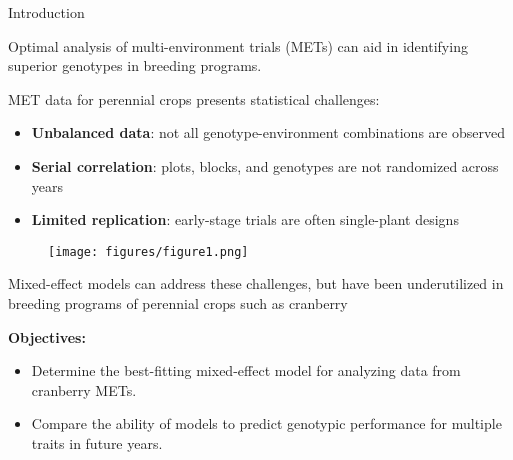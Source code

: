 \documentclass[final]{beamer}
\newlength{\onecolwid}
\begin{document}
\begin{frame}[t]
\begin{columns}[t]
\begin{column}{\onecolwid}
\begin{block}{Introduction}

Optimal analysis of multi-environment trials (METs) can aid in identifying superior genotypes in breeding programs.

\vspace{0.5cm}

MET data for perennial crops presents statistical challenges:
\begin{itemize}
  \item \textbf{Unbalanced data}: not all genotype-environment combinations are observed
  \item \textbf{Serial correlation}: plots, blocks, and genotypes are not randomized across years
  \item \textbf{Limited replication}: early-stage trials are often single-plant designs
\end{itemize}

\vspace{0.5cm}

%
\begin{center}
  \begin{figure}
    \texttt{[image: figures/figure1.png]}
  \end{figure}
\end{center}


\vspace{0.5cm}

Mixed-effect models can address these challenges, but have been underutilized in breeding programs of perennial crops such as cranberry

\vspace{0.5cm}

\textbf{Objectives:}
\begin{itemize}
  \item Determine the best-fitting mixed-effect model for analyzing data from cranberry METs.
  \item Compare the ability of models to predict genotypic performance for multiple traits in future years.
\end{itemize}


\end{block}




\end{column}
\end{columns}
\end{frame}
\end{document}
